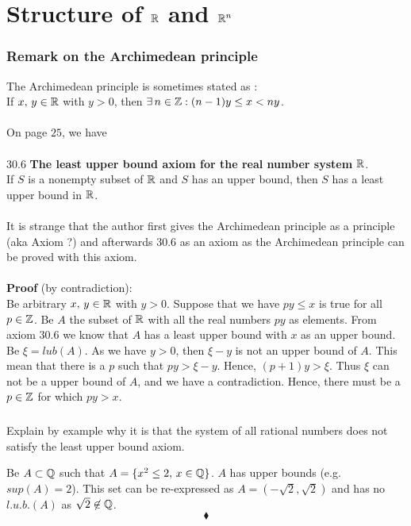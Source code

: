 \chapter{Structure of $\mathbb{R}$ and $\mathbb{R}^{n}$}
\pagebreak[4]

\subsection*{Remark on the Archimedean principle}
The Archimedean principle is sometimes stated as :\\
If $x,\,y\in \mathbb{R}$ with $y>0$, then $\exists\, n\in \mathbb{Z}: (n-1)y\leq x < ny$.\\\\
On page $25$, we have \\\\
$\mathbf{30.6}$ \textbf{The least upper bound axiom for the real number system} $\mathbf{\mathbb{R}}$.\\
If $S$ is a nonempty subset of $\mathbb{R}$ and $S$ has an upper bound, then $S$ has a least upper bound in $\mathbb{R}$.\\\\
It is strange that  the author first gives the Archimedean principle as a principle (aka Axiom ?) and afterwards $\mathbf{30.6}$ as an axiom as the Archimedean principle can be proved with this axiom. \\\\
\textbf{Proof} (by contradiction):\\
Be arbitrary $x,\, y\in \mathbb{R}$ with $y> 0$. Suppose that we have $py\leq x$ is true for all $p\in \mathbb{Z}$. Be $A$ the subset of $\mathbb{R}$ with all the real numbers $py$ as elements. From axiom $\mathbf{30.6}$ we know that $A$ has a least upper bound with $x$ as an upper bound. Be $\xi= lub(A)$. As we have $y>0$, then $\xi -y$ is not an upper bound of $A$.  This mean that there is a $p$ such that $py>\xi -y$. Hence, $ (p+1)y>\xi$. Thus $\xi$ can not be a upper bound of $A$, and we have a contradiction. Hence, there must be a $p\in \mathbb{Z}$ for which $py>x$.
\newpage
\renewcommand{\thesubsection}{\thesection.\arabic{subsection}}
\setcounter{subsection}{0}
\subsection{}
\begin{tcolorbox}
Explain by example why it is that the system of all rational numbers does not satisfy the least upper bound axiom.
\end{tcolorbox}
Be $A\subset\mathbb{Q}$ such that $A=\{x^2\leq 2,\, x\in \mathbb{Q}\}$. $A$ has upper bounds (e.g.  $sup(A)=2$). This set can be re-expressed as $A= (-\sqrt{2},\sqrt{2})$ and has no $l.u.b.(A)$ as $\sqrt{2}\not \in \mathbb{Q}$.
$$\blacklozenge$$

